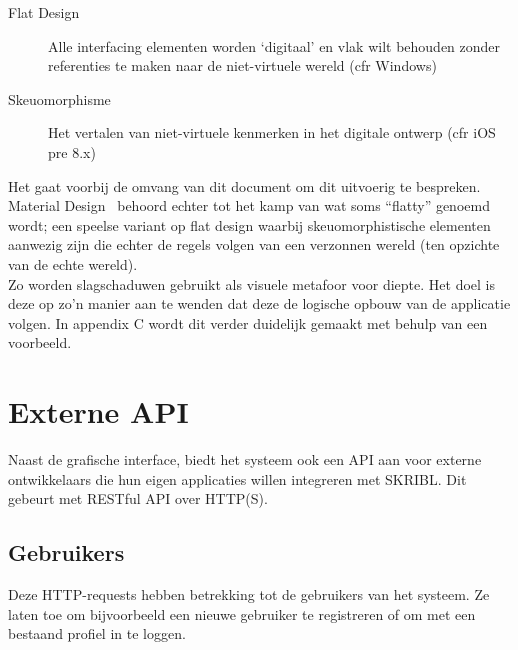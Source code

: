 \documentclass{article}
\begin{document}
\begin{description}

\item[Flat Design] Alle interfacing elementen worden `digitaal' en vlak wilt behouden zonder referenties te maken naar de niet-virtuele wereld (cfr Windows)

\item[Skeuomorphisme] Het vertalen van niet-virtuele kenmerken in het digitale ontwerp (cfr iOS pre 8.x)

\end{description}

Het gaat voorbij de omvang van dit document om dit uitvoerig te bespreken. Material Design~\cite{website:Material} behoord echter tot het kamp van wat soms “flatty” genoemd wordt; een speelse variant op flat design waarbij skeuomorphistische elementen aanwezig zijn die echter de regels volgen van een verzonnen wereld (ten opzichte van de echte wereld).
\\

Zo worden slagschaduwen gebruikt als visuele metafoor voor diepte. Het doel is deze op zo’n manier aan te wenden dat deze de logische opbouw van de applicatie volgen. In appendix C wordt dit verder duidelijk gemaakt met behulp van een voorbeeld.

\clearpage


\section{Externe API}
\label{api}

Naast de grafische interface, biedt het systeem ook een API aan voor externe ontwikkelaars die hun eigen applicaties willen integreren met SKRIBL. Dit gebeurt met RESTful API over HTTP(S).

\subsection{Gebruikers}

Deze HTTP-requests hebben betrekking tot de gebruikers van het systeem. Ze laten toe om bijvoorbeeld een nieuwe gebruiker te registreren of om met een bestaand profiel in te loggen.
\end{document}
